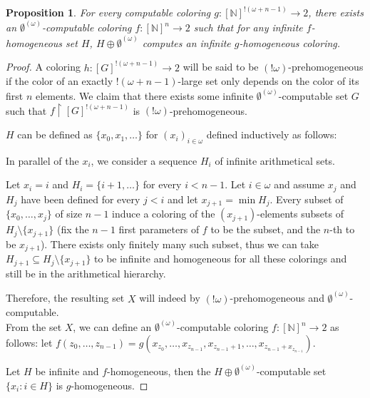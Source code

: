 \documentclass{article}
\newcommand{\uh}{\upharpoonright}
\newcommand{\NN}[0]{\mathbb{N}}
\numberwithin{theorem}{section}
\newtheorem{proposition}[theorem]{Proposition}
\newcommand{\quentin}[1]{\textcolor{green}{#1}}
\begin{document}
\begin{proposition}
    For every computable coloring $g : [\NN]^{!(\omega + n - 1)} \to 2$, there exists an $\emptyset^{(\omega)}$-computable coloring $f : [\NN]^n \to 2$ such that for any infinite $f$-homogeneous set $H$, $H \oplus \emptyset^{(\omega)}$ computes an infinite $g$-homogeneous coloring.  
\end{proposition}

\begin{proof}
A coloring $h : [G]^{!(\omega + n - 1)} \to 2$ will be said to be $(!\omega)$-prehomogeneous if the color of an exactly $!(\omega + n - 1)$-large set only depends on the color of its first $n$ elements. We claim that there exists some infinite $\emptyset^{(\omega)}$-computable set $G$ such that $f \uh [G]^{!(\omega + n - 1)}$ is $(!\omega)$-prehomogeneous.

$H$ can be defined as $\{x_0, x_1, \dots \}$ for $(x_i)_{i \in \omega}$ defined inductively as follows:

In parallel of the $x_i$, we consider a sequence $H_i$ of infinite arithmetical sets.

Let $x_i = i$ and $H_i = \{i+1, \dots \}$ for every $i < n - 1$. Let $i \in \omega$ and assume $x_j$ and $H_j$ have been defined for every $j < i$ and let $x_{j+1} = \min H_j$. Every subset of $\{x_0, \dots, x_{j}\}$ of size $n - 1$ induce a coloring of the $(x_{j+1})$-elements subsets of $H_j \setminus \{x_{j+1}\}$ (fix the $n-1$ first parameters of $f$ to be the subset, and the $n$-th to be $x_{j+1}$). There exists only finitely many such subset, thus we can take $H_{j+1} \subseteq H_{j} \setminus \{x_{j+1}\}$ to be infinite and homogeneous for all these colorings and still be in the arithmetical hierarchy. 

Therefore, the resulting set $X$ will indeed by $(!\omega)$-prehomogeneous and $\emptyset^{(\omega)}$-computable. \\

From the set $X$, we can define an $\emptyset^{(\omega)}$-computable coloring $f : [\NN]^n \to 2$ as follows: let $f(z_0, \dots, z_{n-1}) = g(x_{z_0}, \dots, x_{z_{n-1}}, x_{z_{n-1} + 1}, \dots, x_{z_{n-1} + x_{z_{n-1}}})$.

Let $H$ be infinite and $f$-homogeneous, then the $H \oplus \emptyset^{(\omega)}$-computable set $\{x_i : i \in H\}$ is $g$-homogeneous. 

\end{proof}

\end{document}

